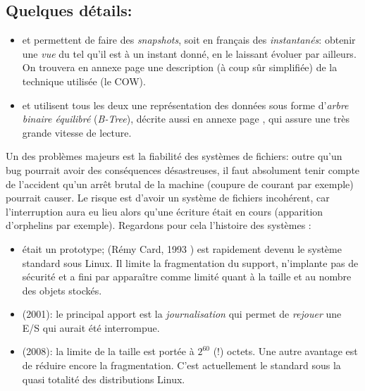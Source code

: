   \subsection*{Quelques détails:}
  \begin{itemize}
    \item {} et  permettent de faire des
      \emph{snapshots}, soit en français des \emph{instantanés}:
      obtenir une \emph{vue} du  \sff{} tel qu'il est  à
     un instant donné, en le
      laissant évoluer par ailleurs. On
      trouvera en annexe page \pageref{meuh} une description (à coup
      sûr simplifiée) de la 
      technique utilisée (le COW).
      \item {} et   utilisent tous les deux une
        représentation des données sous forme d'\emph{arbre binaire
          équilibré} (\emph{B-Tree}), décrite aussi en annexe page
        \pageref{btree}, qui assure une 
        très grande vitesse de lecture.
  \end{itemize}

  Un des problèmes majeurs est la fiabilité des systèmes de fichiers:
  outre qu'un bug pourrait avoir des conséquences désastreuses, il
  faut absolument tenir compte de l'accident qu'un arrêt brutal de la
  machine (coupure de courant par exemple) pourrait causer. Le risque
  est d'avoir un
  système de fichiers incohérent, car l'interruption aura eu lieu
  alors qu'une écriture était en cours (apparition d'orphelins  par
  exemple). Regardons pour cela l'histoire des systèmes 
  :
  \begin{itemize}
    \item {} était un prototype;  (Rémy Card, 1993
      \cite{rcard}) 
      est rapidement devenu le système standard sous Linux. Il limite
      la fragmentation 
      du support, n'implante pas de sécurité et a fini par apparaître
      comme limité quant à la taille et au nombre des objets stockés.
    \item {} (2001): le principal apport est la \emph{journalisation}
      qui permet de \emph{rejouer} une E/S qui aurait été interrompue.
    \item {} (2008): la limite de la taille est portée à
      $2^{60}$ (!) octets. Une autre avantage est de réduire encore la
      fragmentation. C'est actuellement le \sff{} standard sous la
      quasi totalité des distributions Linux. 
  \end{itemize}
  
